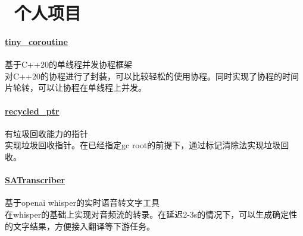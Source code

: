 \section{\faBook\ 个人项目}
\paragraph{ \href{https://github.com/ya-hong/tiny_coroutine}{tiny\_coroutine}} 基于C++20的单线程并发协程框架\\
    对C++20的协程进行了封装，可以比较轻松的使用协程。同时实现了协程的时间片轮转，可以让协程在单线程上并发。
    
\paragraph{ \href{https://github.com/ya-hong/recycled_ptr}{recycled\_ptr} } 有垃圾回收能力的指针\\
    实现垃圾回收指针。在已经指定gc root的前提下，通过标记清除法实现垃圾回收。

\paragraph{ \href{https://github.com/ya-hong/SATranscriber}{SATranscriber} } 基于openai whisper的实时语音转文字工具\\
    在whisper的基础上实现对音频流的转录。在延迟2-3s的情况下，可以生成确定性的文字结果，方便接入翻译等下游任务。
